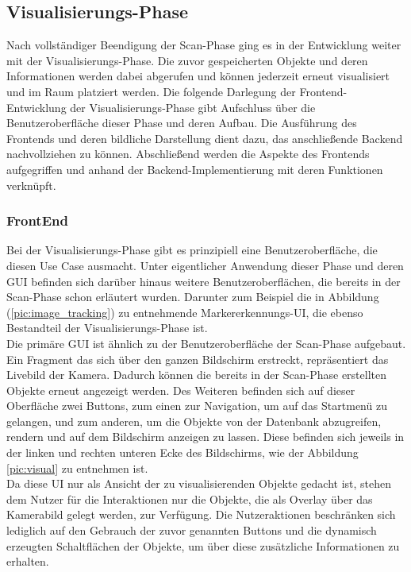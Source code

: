 \subsection{Visualisierungs-Phase} 
Nach vollständiger Beendigung der Scan-Phase ging es in der Entwicklung weiter mit der Visualisierungs-Phase. Die zuvor gespeicherten Objekte und 
deren Informationen werden dabei abgerufen und können jederzeit erneut visualisiert und im Raum platziert werden. Die folgende Darlegung der 
Frontend-Entwicklung der Visualisierungs-Phase gibt Aufschluss über die Benutzeroberfläche dieser Phase und deren Aufbau. Die Ausführung des Frontends und deren bildliche 
Darstellung dient dazu, das anschließende Backend nachvollziehen zu können. Abschließend werden die Aspekte des Frontends aufgegriffen und anhand der Backend-Implementierung 
mit deren Funktionen verknüpft. 
\subsubsection{FrontEnd}
Bei der Visualisierungs-Phase gibt es prinzipiell eine Benutzeroberfläche, die diesen Use Case ausmacht. Unter eigentlicher Anwendung dieser Phase und 
deren \acs{GUI} befinden sich darüber hinaus weitere Benutzeroberflächen, die bereits in der Scan-Phase schon erläutert wurden. Darunter zum Beispiel 
die in Abbildung (\ref{pic:image_tracking}) zu entnehmende Markererkennungs-\acs{UI}, die ebenso Bestandteil der Visualisierungs-Phase ist. 
\\ 
Die primäre \acs{GUI} ist ähnlich zu der Benutzeroberfläche der Scan-Phase aufgebaut. Ein Fragment das sich über den ganzen Bildschirm erstreckt, repräsentiert das 
Livebild der Kamera. Dadurch können die bereits in der Scan-Phase erstellten Objekte erneut angezeigt werden. Des Weiteren befinden 
sich auf dieser Oberfläche zwei Buttons, zum einen zur Navigation, um auf das Startmenü zu gelangen, und zum anderen, um die Objekte von der Datenbank 
abzugreifen, rendern und auf dem Bildschirm anzeigen zu lassen. Diese befinden sich jeweils in der linken und rechten unteren Ecke des Bildschirms, wie 
der Abbildung \ref{pic:visual} zu entnehmen ist. 
\\ 
Da diese \acs{UI} nur als Ansicht der zu visualisierenden Objekte gedacht ist, stehen dem Nutzer für die Interaktionen nur die Objekte, die als Overlay 
über das Kamerabild gelegt werden, zur Verfügung. Die Nutzeraktionen beschränken sich lediglich auf den Gebrauch der zuvor genannten Buttons und die dynamisch erzeugten 
Schaltflächen der Objekte, um über diese zusätzliche Informationen zu erhalten. 
